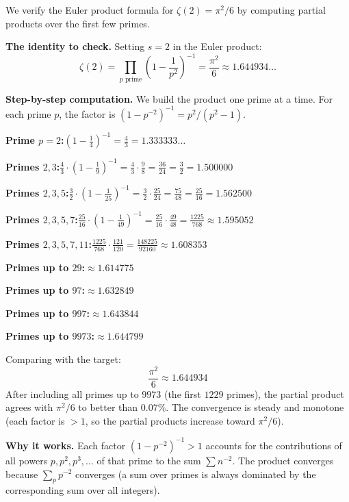 \begin{example}[Numerical verification of the Euler product at $s=2$]
\label{ex:eulerprod_numerical}
We verify the Euler product formula for $\zeta(2) = \pi^2/6$ by computing partial products over the first few primes.

\textbf{The identity to check.} Setting $s = 2$ in the Euler product:
\[
\zeta(2) = \prod_{p \text{ prime}} \left(1 - \frac{1}{p^2}\right)^{-1} = \frac{\pi^2}{6} \approx 1.644934\ldots
\]

\textbf{Step-by-step computation.} We build the product one prime at a time. For each prime $p$, the factor is $(1 - p^{-2})^{-1} = p^2/(p^2 - 1)$.

\medskip
\noindent\textbf{Prime $p = 2$:}\quad $\displaystyle\left(1 - \frac{1}{4}\right)^{-1} = \frac{4}{3} = 1.333333\ldots$

\noindent\textbf{Primes $2, 3$:}\quad $\displaystyle\frac{4}{3} \cdot \left(1 - \frac{1}{9}\right)^{-1} = \frac{4}{3} \cdot \frac{9}{8} = \frac{36}{24} = \frac{3}{2} = 1.500000$

\noindent\textbf{Primes $2, 3, 5$:}\quad $\displaystyle\frac{3}{2} \cdot \left(1 - \frac{1}{25}\right)^{-1} = \frac{3}{2} \cdot \frac{25}{24} = \frac{75}{48} = \frac{25}{16} = 1.562500$

\noindent\textbf{Primes $2, 3, 5, 7$:}\quad $\displaystyle\frac{25}{16} \cdot \left(1 - \frac{1}{49}\right)^{-1} = \frac{25}{16} \cdot \frac{49}{48} = \frac{1225}{768} \approx 1.595052$

\noindent\textbf{Primes $2, 3, 5, 7, 11$:}\quad $\displaystyle\frac{1225}{768} \cdot \frac{121}{120} = \frac{148225}{92160} \approx 1.608353$

\noindent\textbf{Primes up to $29$:}\quad $\approx 1.614775$

\noindent\textbf{Primes up to $97$:}\quad $\approx 1.632849$

\noindent\textbf{Primes up to $997$:}\quad $\approx 1.643844$

\noindent\textbf{Primes up to $9973$:}\quad $\approx 1.644799$

\medskip
\noindent Comparing with the target:
\[
\frac{\pi^2}{6} \approx 1.644934
\]
After including all primes up to $9973$ (the first $1229$ primes), the partial product agrees with $\pi^2/6$ to better than $0.07\%$. The convergence is steady and monotone (each factor is $> 1$, so the partial products increase toward $\pi^2/6$).

\textbf{Why it works.} Each factor $(1 - p^{-2})^{-1} > 1$ accounts for the contributions of all powers $p, p^2, p^3, \ldots$ of that prime to the sum $\sum n^{-2}$. The product converges because $\sum_p p^{-2}$ converges (a sum over primes is always dominated by the corresponding sum over all integers).
\end{example}

